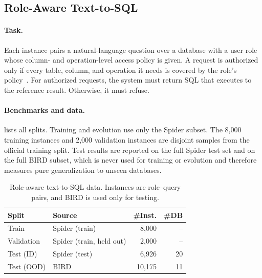 \documentclass[11pt,a4paper]{article}
\begin{document}
\subsection{Role-Aware Text-to-SQL}
\label{app:rbac}

\paragraph{Task.}
Each instance pairs a natural-language question over a database with a user role whose column- and operation-level access policy is given. A request is authorized only if every table, column, and operation it needs is covered by the role's policy~\citep{fei2026benchmarkingtexttosqlrolebasedaccess}. For authorized requests, the system must return SQL that executes to the reference result. Otherwise, it must refuse.

\paragraph{Benchmarks and data.}
 lists all splits. Training and evolution use only the Spider subset. The 8,000 training instances and 2,000 validation instances are disjoint samples from the official training split. Test results are reported on the full Spider test set and on the full BIRD subset, which is never used for training or evolution and therefore measures pure generalization to unseen databases.

\begin{table}[t]
\centering
\footnotesize
\caption{Role-aware text-to-SQL data. Instances are role--query pairs, and BIRD is used only for testing.}
\label{tab:app-rbac-data}
\renewcommand{\arraystretch}{1.05}
\setlength{\tabcolsep}{4pt}
\begin{tabular}{llrr}
\toprule
\textbf{Split} & \textbf{Source} & \textbf{\#Inst.} & \textbf{\#DB} \\
\midrule
Train & Spider (train) & 8,000 & -- \\
Validation & Spider (train, held out) & 2,000 & -- \\
\midrule
Test (ID) & Spider (test) & 6,926 & 20 \\
Test (OOD) & BIRD & 10,175 & 11 \\
\bottomrule
\end{tabular}
\end{table}
\end{document}
